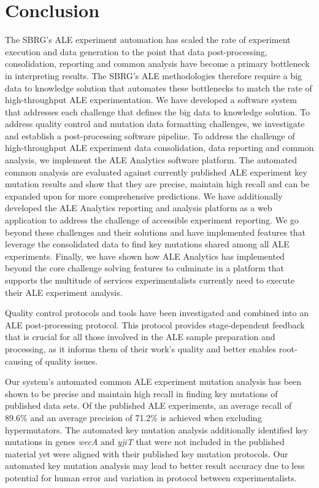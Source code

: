 \documentclass[12pt,final,masters,chapterheads]{ucsd}  %
\begin{document}
\chapter{Conclusion}
The SBRG's ALE experiment automation has scaled the rate of experiment execution and data generation to the point that data post-processing, consolidation, reporting and common analysis have become a primary bottleneck in interpreting results. The SBRG's ALE methodologies therefore require a big data to knowledge solution that automates these bottlenecks to match the rate of high-throughput ALE experimentation. We have developed a software system that addresses each challenge that defines the big data to knowledge solution. To address quality control and mutation data formatting challenges, we investigate and establish a post-processing software pipeline. To address the challenge of high-throughput ALE experiment data consolidation, data reporting and common analysis, we implement the ALE Analytics software platform. The automated common analysis are evaluated against currently published ALE experiment key mutation results and show that they are precise, maintain high recall and can be expanded upon for more comprehensive predictions. We have additionally developed the ALE Analytics reporting and analysis platform as a web application to address the challenge of accessible experiment reporting. We go beyond these challenges and their solutions and have implemented features that leverage the consolidated data to find key mutations shared among all ALE experiments. Finally, we have shown how ALE Analytics has implemented beyond the core challenge solving features to culminate in a platform that supports the multitude of services experimentalists currently need to execute their ALE experiment analysis.

Quality control protocols and tools have been investigated and combined into an ALE post-processing protocol. This protocol provides stage-dependent feedback that is crucial for all those involved in the ALE sample preparation and processing, as it informs them of their work's quality and better enables root-causing of quality issues.

Our system's automated common ALE experiment mutation analysis has been shown to be precise and maintain high recall in finding key mutations of published data sets. Of the published ALE experiments, an average recall of 89.6\% and an average precision of 71.2\% is achieved when excluding hypermutators. The automated key mutation analysis additionally identified key mutations in genes \textit{wecA} and \textit{yjiT} that were not included in the published material yet were aligned with their published key mutation protocols. Our automated key mutation analysis may lead to better result accuracy due to less potential for human error and variation in protocol between experimentalists.
\end{document}
